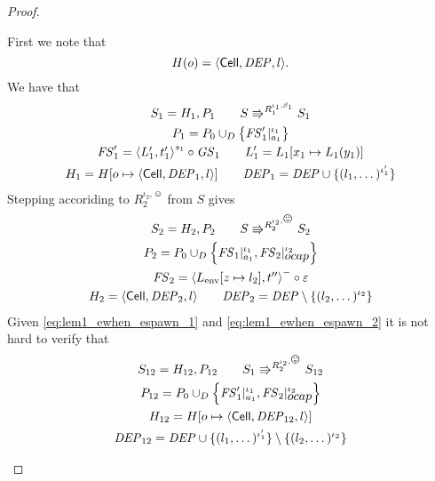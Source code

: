 \begin{proof}
\begin{description}
      First we note that
      \begin{equation}
        H(o) = \mbox{$\langle \mbox{$\mathsf{Cell}$}{}, \mathit{DEP}, l \rangle$}.
      \end{equation}
      We have that 
      \begin{equation} \label{eq:lem1_ewhen_espawn_1}
        \begin{gathered}    
          S_1 = H_1, P_1 \quad\quad S \Rrightarrow^{R_1^{\iota_1, \beta_1}} S_1
          \\
          P_1 = P_0 \cup_D \left\{ \mathit{FS}'_1|_{a_1}^{\iota_1} \right\} \\
          \mathit{FS}'_1 = \mbox{$\langle L'_1, t'_1 \rangle$}^{s_1} \circ \mathit{GS}_1  \quad\quad L'_1 = L_1[x_1 \mapsto
          L_1(y_1)] \\
          H_1 = H[o \mapsto \mbox{$\langle \mbox{$\mathsf{Cell}$}{}, \mathit{DEP}_1, l \rangle$}] \quad\quad \mathit{DEP}_1 = \mathit{DEP} \cup \{ (l_1,
          \dots)^{\iota'_1} \}
        \end{gathered}
      \end{equation}
      Stepping accoriding to $R_2^{\iota_2, \smiley}$ from $S$ gives
      \begin{equation} \label{eq:lem1_ewhen_espawn_2}
        \begin{gathered}
          S_2 = H_2, P_2 \andalso S \Rrightarrow^{R_2^{\iota_2, \smiley}} S_2
          \\
          P_2 = P_0 \cup_D \left\{ \FS_1|_{a_1}^{\iota_1},
          \FS_2|_{\ocap}^{\iota_2} \right\} \\
          \FS_2 = \xframe{L_{\text{env}}[z \mapsto l_2], t''}^{-} \circ
          \varepsilon \\
          H_2 = \Cell{\DEP_2, l} \andalso \DEP_2 = \DEP \setminus \{ (l_2,
          \dots)^{\iota_2} \}
        \end{gathered}
      \end{equation}
      Given \eqref{eq:lem1_ewhen_espawn_1} and \eqref{eq:lem1_ewhen_espawn_2} it
      is not hard to verify that
      \begin{equation} 
        \begin{gathered}
          S_{12} = H_{12}, P_{12} \andalso S_1 \Rrightarrow^{R_2^{\iota_2,
          \smiley}} S_{12}
          \\
          P_{12} = P_0 \cup_D \left\{ \FS'_1|_{a_1}^{\iota_1},
          \FS_2|_{\ocap}^{\iota_2} \right\} \\
          H_{12} = H[o \mapsto \Cell{\DEP_{12}, l}] \\ 
          \DEP_{12} = \DEP \cup \{ (l_1, \dots)^{\iota'_1} \} \setminus \{ (l_2,
          \dots)^{\iota_2} \}

\end{gathered}
\end{equation}
\end{description}
\end{proof}
